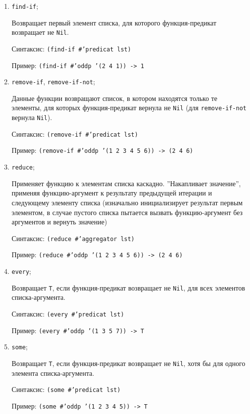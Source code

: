 \begin{enumerate}
    \item \texttt{find-if};

        Возвращает первый элемент списка, для которого функция-предикат возвращает не \texttt{Nil}.

        Синтаксис: \texttt{(find-if \#'predicat lst)}

        Пример: \texttt{(find-if \#'oddp '(2 4 1)) -> 1}

    \item \texttt{remove-if}, \texttt{remove-if-not};

        Данные функции возвращают список, в котором находятся только те элементы, для которых функция-предикат вернула не \texttt{Nil} (для \texttt{remove-if-not} вернула \texttt{Nil}).

        Синтаксис: \texttt{(remove-if \#'predicat lst)}

        Пример: \texttt{(remove-if \#'oddp '(1 2 3 4 5 6)) -> (2 4 6)}

    \item \texttt{reduce};

        Применяет функцию к элементам списка каскадно. ''Накапливает значение'', применяя функцию-аргумент к результату предыдущей итерации и следующему элементу списка (изначально инициализирует результат первым элементом, в случае пустого списка пытается вызвать функцию-аргумент без аргументов и вернуть значение)

        Синтаксис: \texttt{(reduce \#'aggregator lst)}

        Пример: \texttt{(reduce \#'oddp '(1 2 3 4 5 6)) -> (2 4 6)}

    \item \texttt{every};

        Возвращает \texttt{T}, если функция-предикат возвращает не \texttt{Nil}, для всех элементов списка-аргумента.

        Синтаксис: \texttt{(every \#'predicat lst)}

        Пример: \texttt{(every \#'oddp '(1 3 5 7)) -> T}

    \item \texttt{some};

        Возвращает \texttt{T}, если функция-предикат возвращает не \texttt{Nil}, хотя бы для одного элемента списка-аргумента.

        Синтаксис: \texttt{(some \#'predicat lst)}

        Пример: \texttt{(some \#'oddp '(1 2 3 4 5)) -> T}
\end{enumerate}
